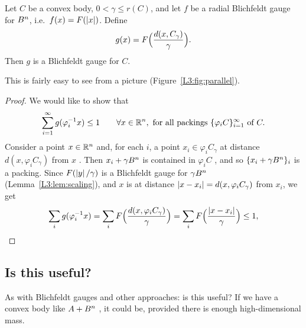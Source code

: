 \begin{theorem}\label{L3:thm:parallel}
Let $C$ be a convex body, $0<\gamma\le r(C)$, and let $f$ be a radial Blichfeldt gauge for $B^n$, i.e.\ $f(x)=F(\left\lvert x \right\rvert)$.
Define
\[
  g(x)=F\Bigl(\frac{d(x,C_\gamma)}{\gamma}\Bigr).
\]
Then $g$ is a Blichfeldt gauge for $C$.
\end{theorem}

This is fairly easy to see from a picture (Figure~\ref{L3:fig:parallel}).

\begin{proof}
We would like to show that
\[
  \sum_{i=1}^\infty g(\varphi_i^{-1}x)\le1\qquad\forall x\in\mathbb{R}^n,\ \text{for all packings }\{\varphi_iC\}_{i=1}^\infty \text{ of } C.
\]
Consider a point $x\in\mathbb{R}^n$ and, for each $i$, a point $x_i\in\varphi_iC_\gamma$ at distance $d(x,\varphi_iC_\gamma)$ from $x$
. Then $x_i+\gamma B^n$ is contained in $\varphi_iC$
, and so $\{x_i+\gamma B^n\}_i$ is a packing.
%
Since $F(\left\lvert y \right\rvert/\gamma)$ is a Blichfeldt gauge for $\gamma B^n$ (Lemma~\ref{L3:lem:scaling}), and $x$ is at distance
$\left\lvert x-x_i \right\rvert=d(x,\varphi_iC_\gamma)$ from $x_i$, we get
\[
  \sum_i g(\varphi_i^{-1}x)=\sum_i F\Bigl(\frac{d(x,\varphi_iC_\gamma)}{\gamma}\Bigr)=\sum_i F\Bigl(\frac{\left\lvert x-x_i \right\rvert}{\gamma}\Bigr)\le 1,
\]
\end{proof}

\subsection*{Is this useful?}
As with Blichfeldt gauges and other approaches: is this useful? If we have a convex body like $A+B^n$ , it could be, provided there is enough high-dimensional mass.

